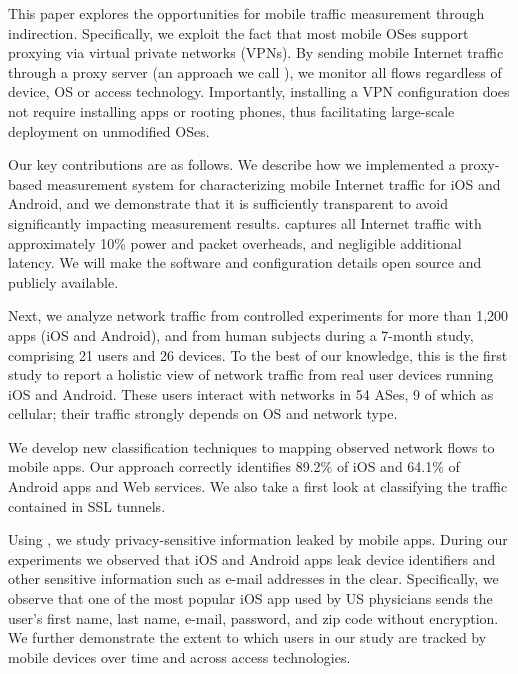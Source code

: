 This paper explores the opportunities for mobile traffic measurement through indirection. 
Specifically, we exploit the fact that most mobile OSes support proxying via virtual private networks (VPNs). 
By sending mobile Internet traffic through a proxy server (an approach we call \platname), we monitor all flows regardless of device, OS or access technology. 
Importantly, installing a VPN configuration does not require installing apps or rooting phones, thus facilitating large-scale deployment on unmodified OSes.



Our key contributions are as follows. We describe how we implemented a proxy-based measurement system for characterizing mobile Internet traffic for iOS and Android, 
and we demonstrate that it is sufficiently transparent to avoid significantly impacting measurement results. 
\platname captures all Internet traffic with approximately 10\% power and packet overheads, and negligible additional latency. 
We will make the \platname software and configuration details open source and publicly available.

Next, we analyze network traffic from controlled experiments for more than 1,200 apps (iOS and Android), 
and from human subjects during a 7-month study, comprising 21 users and 26 devices. To the best of our knowledge, this is the first study to report a holistic 
view of network traffic from real user devices running iOS and Android. These users interact with networks in 54 ASes, 9 of which as cellular; their traffic 
strongly depends on OS and network type.

We develop new classification techniques to mapping observed network flows to mobile apps. Our approach correctly identifies 89.2\% of iOS and 64.1\% of Android apps and Web services. We also take a first look at classifying the traffic contained in SSL tunnels.

Using \platname, we study privacy-sensitive information leaked by mobile apps. During our experiments we observed that iOS and Android apps leak device identifiers and other sensitive information such as e-mail addresses in the clear. Specifically, we observe that one of the most popular iOS app used by US physicians sends the user's first name, last name, e-mail, password, and zip code without encryption. We further demonstrate the extent to which users in our study are tracked by mobile devices over time and across access technologies. 

